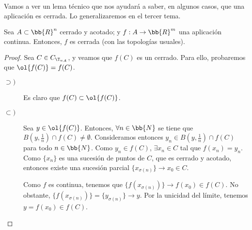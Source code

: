 Vamos a ver un lema técnico que nos ayudará a saber, en algunos casos, que una aplicación es cerrada. Lo generalizaremos en el tercer tema.
\begin{lema}
    Sea $A\subset \bb{R}^n$ cerrado y acotado; y $f:A\to \bb{R}^m$ una aplicación continua. Entonces, $f$ es cerrada (con las topologías usuales).
\end{lema}
\begin{proof}
    Sea $C\in C_{{\T_u}_A}$, y veamos que $f(C)$ es un cerrado. Para ello, probaremos que $\ol{f(C)}=f(C)$.
    \begin{description}
        \item[$\supset)$] Es claro que $f(C)\subset\ol{f(C)}$.

        \item[$\subset)$] Sea $y\in \ol{f(C)}$. Entonces, $\forall n\in \bb{N}$ se tiene que $B\left(y,\frac{1}{n}\right)\cap f(C)\neq \emptyset$. Consideramos entonces $y_n\in B\left(y,\frac{1}{n}\right)\cap f(C)$ para todo $n\in \bb{N}$. Como $y_n\in f(C)$, $\exists x_n\in C$ tal que $f(x_n)=y_n$. Como $\{x_n\}$ es una sucesión de puntos de $C$, que es cerrado y acotado, entonces existe una sucesión parcial $\{x_{\sigma(n)}\}\to x_0\in C$.

        Como $f$ es continua, tenemos que $\{f(x_{\sigma(n)})\}\to f(x_0)\in f(C)$. No obstante, $\{f(x_{\sigma(n)})\}=\{y_{\sigma(n)}\}\to y$. Por la unicidad del límite, tenemos $y=f(x_0)\in f(C)$.
    \end{description}
\end{proof}

